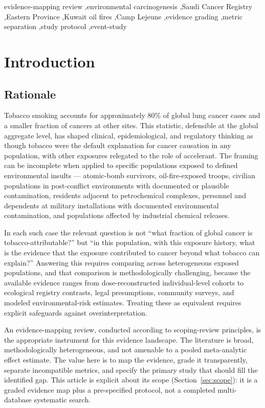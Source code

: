 \documentclass[3p,times]{elsarticle}
\begin{document}
\begin{frontmatter}
\begin{keyword}
evidence-mapping review \sep environmental carcinogenesis \sep Saudi Cancer Registry \sep Eastern Province \sep Kuwait oil fires \sep Camp Lejeune \sep evidence grading \sep metric separation \sep study protocol \sep event-study
\end{keyword}

\end{frontmatter}

\section{Introduction}

\subsection{Rationale}
Tobacco smoking accounts for approximately 80\% of global lung cancer cases and a smaller fraction of cancers at other sites. This statistic, defensible at the global aggregate level, has shaped clinical, epidemiological, and regulatory thinking as though tobacco were the default explanation for cancer causation in any population, with other exposures relegated to the role of accelerant. The framing can be incomplete when applied to specific populations exposed to defined environmental insults --- atomic-bomb survivors, oil-fire-exposed troops, civilian populations in post-conflict environments with documented or plausible contamination, residents adjacent to petrochemical complexes, personnel and dependents at military installations with documented environmental contamination, and populations affected by industrial chemical releases.

In each such case the relevant question is not ``what fraction of global cancer is tobacco-attributable?'' but ``in this population, with this exposure history, what is the evidence that the exposure contributed to cancer beyond what tobacco can explain?'' Answering this requires comparing across heterogeneous exposed populations, and that comparison is methodologically challenging, because the available evidence ranges from dose-reconstructed individual-level cohorts to ecological registry contrasts, legal presumptions, community surveys, and modeled environmental-risk estimates. Treating these as equivalent requires explicit safeguards against overinterpretation.

An evidence-mapping review, conducted according to scoping-review principles, is the appropriate instrument for this evidence landscape. The literature is broad, methodologically heterogeneous, and not amenable to a pooled meta-analytic effect estimate. The value here is to map the evidence, grade it transparently, separate incompatible metrics, and specify the primary study that should fill the identified gap. This article is explicit about its scope (Section~\ref{sec:scope}): it is a graded evidence map plus a pre-specified protocol, not a completed multi-database systematic search.
\end{document}
